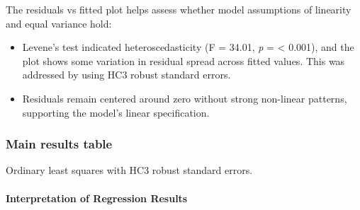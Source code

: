 \documentclass[
]{article}
\providecommand{\tightlist}{%
  \setlength{\itemsep}{0pt}\setlength{\parskip}{0pt}}
\begin{document}
The residuals vs fitted plot helps assess whether model assumptions of
linearity and equal variance hold:

\begin{itemize}
\tightlist
\item
  Levene's test indicated heteroscedasticity (F = 34.01, \emph{p} =
  \textless{} 0.001), and the plot shows some variation in residual
  spread across fitted values. This was addressed by using HC3 robust
  standard errors.
\item
  Residuals remain centered around zero without strong non-linear
  patterns, supporting the model's linear specification.
\end{itemize}

\subsubsection{Main results table}\label{main-results-table}

Ordinary least squares with HC3 robust standard errors.

\paragraph{Interpretation of Regression
Results}\label{interpretation-of-regression-results}
\end{document}
